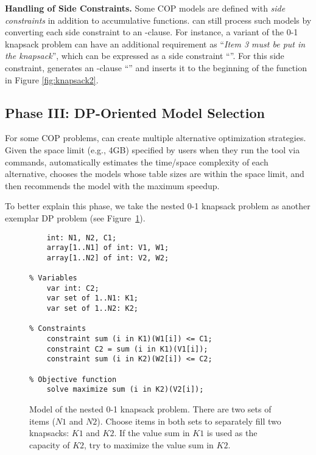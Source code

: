 \textbf{Handling of Side Constraints.} 
Some COP models are defined with \emph{side constraints} in addition to accumulative functions. \tool can still process such models by converting each side constraint to an -clause. 
For instance, a variant of the 0-1 knapsack problem can have an additional requirement as ``\emph{Item 3 must be put in the knapsack}'', which can be expressed as a side constraint ``''. For this side constraint, \tool generates an -clause ``'' and inserts it to the beginning of the  function in Figure \ref{fig:knapsack2}.

 
 
 \subsection{Phase III: DP-Oriented Model Selection}
 \label{sec:select}
 
 For some COP problems, \tool can create multiple alternative optimization strategies. Given the space limit (e.g., 4GB) specified by users when they run the tool via commands, \tool automatically estimates the time/space complexity of each alternative, chooses the models whose table sizes are within the space limit, and then recommends the model with the maximum speedup.  
 
To better explain this phase, we take the nested 0-1 knapsack problem as another exemplar DP problem (see Figure~\ref{fig:knapsack3}).  
 	\begin{figure}[htb]
\begin{lstlisting}[frame=single]
% Input arguments
    int: N1, N2, C1;
    array[1..N1] of int: V1, W1;
    array[1..N2] of int: V2, W2;

% Variables
    var int: C2;
    var set of 1..N1: K1;
    var set of 1..N2: K2;

% Constraints
    constraint sum (i in K1)(W1[i]) <= C1;
    constraint C2 = sum (i in K1)(V1[i]);
    constraint sum (i in K2)(W2[i]) <= C2;
    
% Objective function
    solve maximize sum (i in K2)(V2[i]);
\end{lstlisting}
\caption{Model of the nested 0-1 knapsack problem. There are two sets of items ($N1$ and $N2$).
Choose items in both sets to separately fill two knapsacks: $K1$ and $K2$. If the value sum in $K1$ is used as the capacity of $K2$, try to maximize the value sum in $K2$.}\label{fig:knapsack3}
\end{figure}

